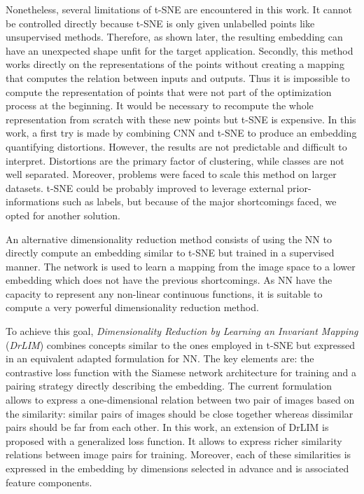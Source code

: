 \documentclass[a4paper,12pt]{report}
\begin{document}
Nonetheless, several limitations of t-SNE are encountered in this work.
It cannot be controlled directly because t-SNE is only given unlabelled points like unsupervised methods.
Therefore, as shown later, the resulting embedding can have an unexpected shape unfit for the target application.
Secondly, this method works directly on the representations of the points without creating a mapping that computes the relation between inputs and outputs.
Thus it is impossible to compute the representation of points that were not part of the optimization process at the beginning.
It would be necessary to recompute the whole representation from scratch with these new points but t-SNE is expensive.
In this work, a first try is made by combining CNN and t-SNE to produce an embedding quantifying distortions.
However, the results are not predictable and difficult to interpret.
Distortions are the primary factor of clustering, while classes are not well separated.
Moreover, problems were faced to scale this method on larger datasets.
t-SNE could be probably improved to leverage external prior-informations such as labels, but because of the major shortcomings faced, we opted for another solution.

An alternative dimensionality reduction method consists of using the NN to directly compute an embedding similar to t-SNE but trained in a supervised manner.
The network is used to learn a mapping from the image space to a lower embedding which does not have the previous shortcomings.
As NN have the capacity to represent any non-linear continuous functions\cite{csaji2001approximation}, it is suitable to compute a very powerful dimensionality reduction method.

To achieve this goal, {\em Dimensionality Reduction by Learning an Invariant Mapping} ({\em DrLIM}) combines concepts similar to the ones employed in t-SNE but expressed in an equivalent adapted formulation for NN\cite{hadsell2006dimensionality}.
The key elements are: the contrastive loss function with the Siamese network architecture for training and a pairing strategy directly describing the embedding.
The current formulation allows to express a one-dimensional relation between two pair of images based on the similarity: similar pairs of images should be close together whereas dissimilar pairs should be far from each other.
In this work, an extension of DrLIM is proposed with a generalized loss function.
It allows to express richer similarity relations between image pairs for training.
Moreover, each of these similarities is expressed in the embedding by dimensions selected in advance and is associated feature components.
\end{document}
